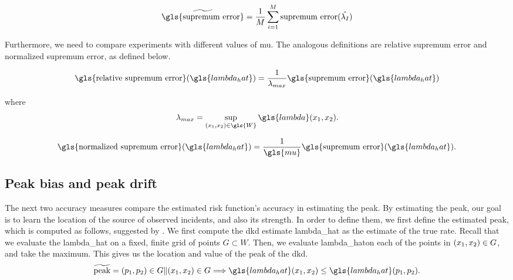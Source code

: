 \begin{equation}
    \widetilde{\mbox{\gls{supremum error}}} = \frac{1}{M} \sum_{i=1}^{M} \mbox{supremum error}(\hat{\lambda_I})
\end{equation}

Furthermore, we need to compare experiments with different values of \gls{mu}.
The analogous definitions are \gls{relative supremum error} and \gls{normalized supremum error}, as defined below.

\begin{equation}
\label{eq:relative_supremum_error}
    \mbox{\gls{relative supremum error}}(\gls{lambda_hat}) = 
        \frac{1}{\lambda_{max}} \mbox{\gls{supremum error}}(\gls{lambda_hat})
\end{equation}

where
\begin{equation}
\label{eq:lambda_max}
    \lambda_{max} = \sup_{\xvec \in \gls{W}}{\gls{lambda}\xvec} \text{.}
\end{equation}

\begin{equation}
\label{eq:normalized_supremum_error}
    \mbox{\gls{normalized supremum error}}(\gls{lambda_hat}) = 
        \frac{1}{\gls{mu}} \mbox{\gls{supremum error}}(\gls{lambda_hat}) \text{.}
\end{equation}

\subsection{Peak bias and peak drift}
\label{subsec:method:peak_bias}

The next two accuracy measures compare the estimated risk function's accuracy in estimating the peak.
By estimating the peak,
our goal is to learn the location of the source of observed incidents,
and also its strength.
In order to define them,
we first define the estimated peak,
which is computed as follows,
suggested by \citet{parzen1961mathematical}.
We first compute the \gls{dkd} estimate \gls{lambda_hat} as the estimate of the true rate.
Recall that we evaluate the \gls{lambda_hat} on a fixed, finite grid of points $G \subset W$.
Then,
we evaluate \gls{lambda_hat}\xvec on each of the points in $(x_1, x_2) \in G$, and take the maximum.
This gives us the location and value of the peak of the \gls{dkd}.
\begin{equation}
    \widetilde{\mbox{peak}} = (p_1, p_2) \in G \|%
        \xvec \in G \Longrightarrow \gls{lambda_hat}\xvec \leq \gls{lambda_hat}(p_1, p_2) \text{.}%
\end{equation}

